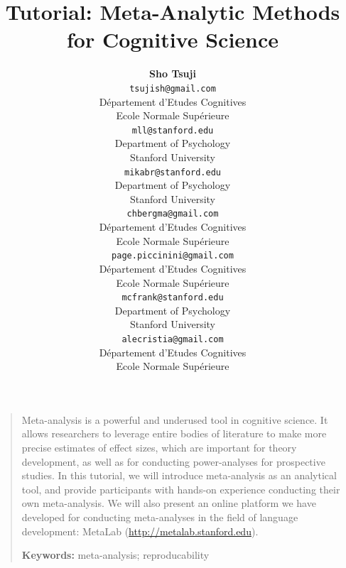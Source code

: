 \documentclass[10pt,letterpaper]{article}
\title{Tutorial: Meta-Analytic Methods for Cognitive Science}
\author{{\large \bf Sho Tsuji } \\
    \texttt{tsujish@gmail.com}\\
  D\'epartement d'Etudes Cognitives\\
   Ecole Normale Sup\'erieure
  \And {\large \bf Molly Lewis} \\
  \texttt{mll@stanford.edu}\\
    Department of Psychology\\
    Stanford University
  \And {\large \bf Mika Braginsky} \\
    \texttt{mikabr@stanford.edu}\\
      Department of Psychology\\
      Stanford University
  \AND {\large \bf Christina Bergmann} \\
      \texttt{chbergma@gmail.com}\\
  D\'epartement d'Etudes Cognitives\\
   Ecole Normale Sup\'erieure
     \And      {\large \bf Page Piccinini } \\
     \texttt{page.piccinini@gmail.com}\\
  D\'epartement d'Etudes Cognitives\\
   Ecole Normale Sup\'erieure
  \And        {\large \bf Michael C. Frank} \\
     \texttt{mcfrank@stanford.edu}\\
            Department of Psychology \\
            Stanford University
  \AND          {\large \bf Alejandrina Cristia} \\
      \texttt{alecristia@gmail.com}\\
  D\'epartement d'Etudes Cognitives\\
   Ecole Normale Sup\'erieure}
\begin{document}
\maketitle

\begin{quote}
\small
Meta-analysis is a powerful and underused tool in cognitive science. It allows researchers to leverage entire bodies of literature to make more precise estimates of effect sizes, which are important for theory development, as well as for conducting power-analyses for prospective studies. In this tutorial, we will introduce meta-analysis as an analytical tool, and provide participants with hands-on experience conducting their own meta-analysis. We will also present an online platform we have developed for conducting meta-analyses in the field of language development: MetaLab (\url{http://metalab.stanford.edu}). 

\textbf{Keywords:}
meta-analysis; reproducability
\end{quote}


\end{document}
